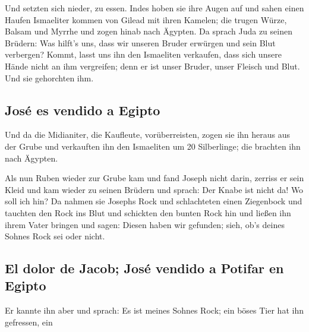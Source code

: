  Und setzten sich nieder, zu essen. Indes hoben sie ihre
Augen auf und sahen einen Haufen Ismaeliter kommen von Gilead mit ihren
Kamelen; die trugen Würze, Balsam und Myrrhe und zogen hinab nach
Ägypten.  Da sprach Juda zu seinen Brüdern: Was hilft's
uns, dass wir unseren Bruder erwürgen und sein Blut verbergen?
 Kommt, lasst uns ihn den Ismaeliten verkaufen, dass sich
unsere Hände nicht an ihm vergreifen; denn er ist unser Bruder, unser
Fleisch und Blut. Und sie gehorchten ihm.

\hypertarget{josuxe9-es-vendido-a-egipto}{%
\subsection{José es vendido a
Egipto}\label{josuxe9-es-vendido-a-egipto}}

 Und da die Midianiter, die Kaufleute, vorüberreisten,
zogen sie ihn heraus aus der Grube und verkauften ihn den Ismaeliten um
20 Silberlinge; die brachten ihn nach Ägypten.

 Als nun Ruben wieder zur Grube kam und fand Joseph nicht
darin, zerriss er sein Kleid  und kam wieder zu seinen
Brüdern und sprach: Der Knabe ist nicht da! Wo soll ich hin?
 Da nahmen sie Josephs Rock und schlachteten einen
Ziegenbock und tauchten den Rock ins Blut  und schickten
den bunten Rock hin und ließen ihn ihrem Vater bringen und sagen: Diesen
haben wir gefunden; sieh, ob's deines Sohnes Rock sei oder nicht.

\hypertarget{el-dolor-de-jacob-josuxe9-vendido-a-potifar-en-egipto}{%
\subsection{El dolor de Jacob; José vendido a Potifar en
Egipto}\label{el-dolor-de-jacob-josuxe9-vendido-a-potifar-en-egipto}}

 Er kannte ihn aber und sprach: Es ist meines Sohnes
Rock; ein böses Tier hat ihn gefressen, ein